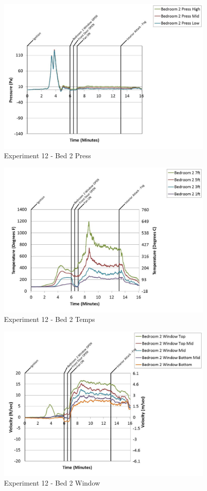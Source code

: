\documentclass{article}
\begin{document}
\begin{appendices}
	\begin{figure}[h!]
		\centering
		\includegraphics[height=3.05in]{0_Images/Results_Charts/Exp_12_Charts/Bed2Press.pdf}
		\caption{Experiment 12 - Bed 2 Press}
	\end{figure}
 
	\clearpage

	\begin{figure}[h!]
		\centering
		\includegraphics[height=3.05in]{0_Images/Results_Charts/Exp_12_Charts/Bed2Temps.pdf}
		\caption{Experiment 12 - Bed 2 Temps}
	\end{figure}
 

	\begin{figure}[h!]
		\centering
		\includegraphics[height=3.05in]{0_Images/Results_Charts/Exp_12_Charts/Bed2Window.pdf}
		\caption{Experiment 12 - Bed 2 Window}
	\end{figure}
 

\end{appendices}
\end{document}
